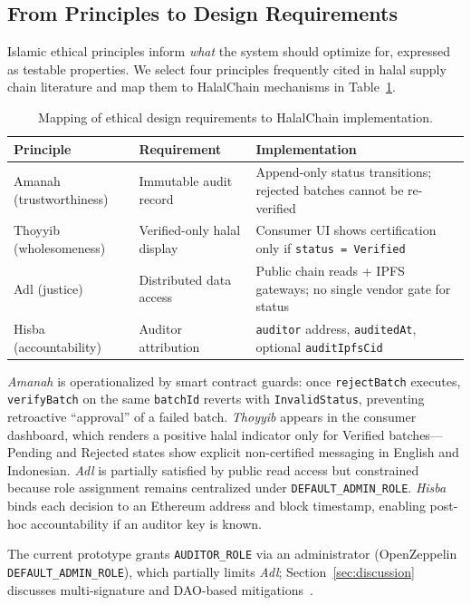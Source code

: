\subsection{From Principles to Design Requirements}
Islamic ethical principles inform \emph{what} the system should optimize for, expressed as testable properties.
We select four principles frequently cited in halal supply chain literature and map them to HalalChain mechanisms in Table~\ref{tab:ethics}.

\begin{table}[t]
  \caption{Mapping of ethical design requirements to HalalChain implementation.}
  \label{tab:ethics}
  \centering
  \footnotesize
  \setlength{\tabcolsep}{3pt}
  \begin{tabularx}{\columnwidth}{@{}>{\raggedright\arraybackslash}p{}>{\raggedright\arraybackslash}p{}X@{}}
    \toprule
    \textbf{Principle} & \textbf{Requirement} & \textbf{Implementation} \\
    \midrule
    Amanah (trustworthiness) & Immutable audit record & Append-only status transitions; rejected batches cannot be re-verified \\
    Thoyyib (wholesomeness) & Verified-only halal display & Consumer UI shows certification only if \texttt{status = Verified} \\
    Adl (justice) & Distributed data access & Public chain reads + IPFS gateways; no single vendor gate for status \\
    Hisba (accountability) & Auditor attribution & \texttt{auditor} address, \texttt{auditedAt}, optional \texttt{auditIpfsCid} \\
    \bottomrule
  \end{tabularx}
\end{table}

\emph{Amanah} is operationalized by smart contract guards: once \texttt{rejectBatch} executes, \texttt{verifyBatch} on the same \texttt{batchId} reverts with \texttt{InvalidStatus}, preventing retroactive ``approval'' of a failed batch.
\emph{Thoyyib} appears in the consumer dashboard, which renders a positive halal indicator only for Verified batches---Pending and Rejected states show explicit non-certified messaging in English and Indonesian.
\emph{Adl} is partially satisfied by public read access but constrained because role assignment remains centralized under \texttt{DEFAULT\_ADMIN\_ROLE}.
\emph{Hisba} binds each decision to an Ethereum address and block timestamp, enabling post-hoc accountability if an auditor key is known.

The current prototype grants \texttt{AUDITOR\_ROLE} via an administrator (OpenZeppelin \texttt{DEFAULT\_ADMIN\_ROLE}), which partially limits \emph{Adl}; Section~\ref{sec:discussion} discusses multi-signature and DAO-based mitigations~\cite{gnosis2024safe}.

\FloatBarrier
